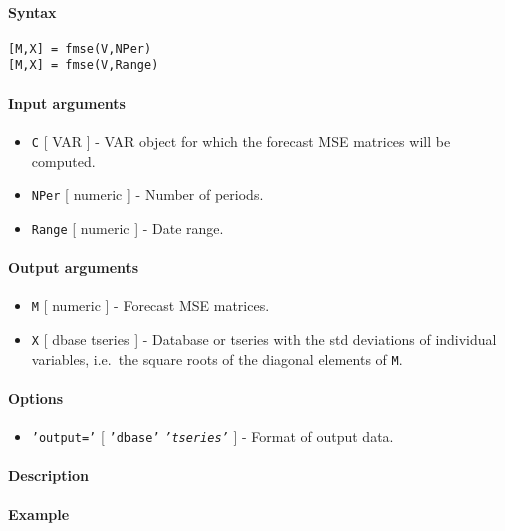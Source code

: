 


	\paragraph{Syntax}\label{syntax}

\begin{verbatim}
[M,X] = fmse(V,NPer)
[M,X] = fmse(V,Range)
\end{verbatim}

\paragraph{Input arguments}\label{input-arguments}

\begin{itemize}
\item
  \texttt{C} {[} VAR {]} - VAR object for which the forecast MSE
  matrices will be computed.
\item
  \texttt{NPer} {[} numeric {]} - Number of periods.
\item
  \texttt{Range} {[} numeric {]} - Date range.
\end{itemize}

\paragraph{Output arguments}\label{output-arguments}

\begin{itemize}
\item
  \texttt{M} {[} numeric {]} - Forecast MSE matrices.
\item
  \texttt{X} {[} dbase \textbar{} tseries {]} - Database or tseries with
  the std deviations of individual variables, i.e.~the square roots of
  the diagonal elements of \texttt{M}.
\end{itemize}

\paragraph{Options}\label{options}

\begin{itemize}
\itemsep1pt\parskip0pt
\item
  \texttt{'output='} {[} \texttt{'dbase'} \textbar{}
  \emph{\texttt{'tseries'}} {]} - Format of output data.
\end{itemize}

\paragraph{Description}\label{description}

\paragraph{Example}\label{example}



